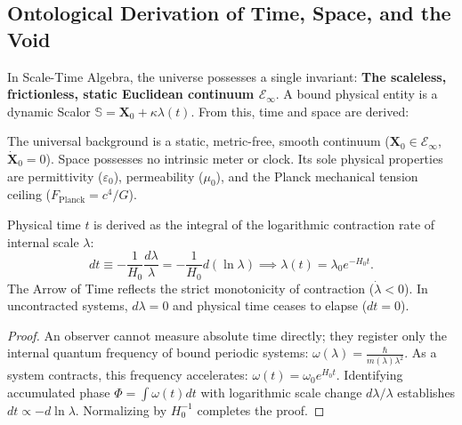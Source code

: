 \subsection{Ontological Derivation of Time, Space, and the Void}
\label{sec:zaman_konum_turetilis_main}

In Scale-Time Algebra, the universe possesses a single invariant: \textbf{The scaleless, frictionless, static Euclidean continuum $\mathcal{E}_\infty$}. A bound physical entity is a dynamic Scalor $\mathbb{S} = \mathbf{X}_0 + \kappa \lambda(t)$. From this, time and space are derived:

\begin{axiom}
    \label{ax:statik_sureklilik_main}
    The universal background is a static, metric-free, smooth continuum ($\mathbf{X}_0 \in \mathcal{E}_\infty$, $\dot{\mathbf{X}}_0 = 0$). Space possesses no intrinsic meter or clock. Its sole physical properties are permittivity ($\varepsilon_0$), permeability ($\mu_0$), and the Planck mechanical tension ceiling ($F_{\mathrm{Planck}} = c^4/G$).
\end{axiom}

\begin{theorem}
    \label{thm:zaman_turetilis}
    Physical time $t$ is derived as the integral of the logarithmic contraction rate of internal scale $\lambda$:
    \begin{equation}
        dt \equiv -\frac{1}{H_0} \frac{d\lambda}{\lambda} = -\frac{1}{H_0} d(\ln \lambda) \implies \lambda(t) = \lambda_0 e^{-H_0 t}.
        \label{eq:zaman_turetilis_main}
    \end{equation}
    The Arrow of Time reflects the strict monotonicity of contraction ($\dot{\lambda} < 0$). In uncontracted systems, $d\lambda = 0$ and physical time ceases to elapse ($dt = 0$).
\end{theorem}

\begin{proof}
    An observer cannot measure absolute time directly; they register only the internal quantum frequency of bound periodic systems: $\omega(\lambda) = \frac{\hbar}{m(\lambda) \lambda^2}$. As a system contracts, this frequency accelerates: $\omega(t) = \omega_0 e^{H_0 t}$. Identifying accumulated phase $\Phi = \int \omega(t) dt$ with logarithmic scale change $d\lambda/\lambda$ establishes $dt \propto -d\ln\lambda$. Normalizing by $H_0^{-1}$ completes the proof.
\end{proof}

